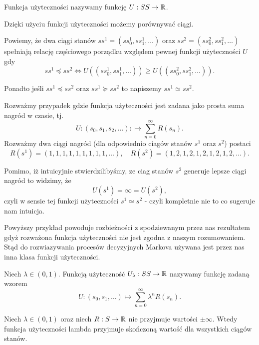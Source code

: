 \documentclass[10pt,a4paper]{book}
\begin{document}
\begin{definition}
Funkcja użyteczności nazywamy funkcję $U: SS \to \mathbb{R}$. 
\end{definition}

Dzięki użyciu funkcji użyteczności możemy porównywać ciągi.

\begin{definition}
Powiemy, że dwa ciągi stanów $ ss^1 = (ss^1_0, ss^1_1, \ldots)$ oraz $ss^2 = (ss^2_0, ss^2_1, \ldots)$ spełniają relację częściowego porządku względem pewnej funkcji użyteczności $U$ gdy
$$
ss^1 \preceq ss^2 \iff U((ss^1_0, ss^1_1, \ldots)) \geq U((ss^2_0, ss^2_1, \ldots)).
$$

Ponadto jeśli $ss^1 \preceq ss^2$ oraz $ss^1 \succeq ss^2$ to napiszemy $ ss^1 \simeq ss^2$.
\end{definition}

\begin{problem}
Rozważmy przypadek gdzie funkcja użyteczności jest zadana jako prosta suma nagród w czasie, tj.
$$
U : (s_0, s_1, s_2, \ldots) : \mapsto \sum_{n=0}^{\infty} R(s_n).
$$
Rozważmy dwa ciągi nagród (dla odpowiednio ciagów stanów $s^1$ oraz $s^2$) postaci
$$
R(s^1) = (1,1,1,1,1,1,1,1,1,\ldots), \quad R(s^2) = (1,2,1,2,1,2,1,2,1,2,\ldots).
$$

Pomimo, iż intuicyjnie stwierdzilibyśmy, ze ciag stanów $s^2$ generuje lepsze ciągi nagród to widzimy, że
$$
U(s^1) = \infty = U(s^2),
$$
czyli w sensie tej funkcji użyteczności $s^1 \simeq s^2$ - czyli kompletnie nie to co sugeruje nam intuicja.
\end{problem}

Powyższy przykład powoduje rozbieżności z spodziewanym przez nas rezultatem gdyż rozważona funkcja użyteczności nie jest zgodna z naszym rozumowaniem. Stąd do rozwiazywania procesów decyzyjnych Markova używana jest przez nas inna klasa funkcji użyteczności.

\begin{definition}
Niech $\lambda \in (0,1)$. Funkcją użyteczność $U_\lambda : SS \to \mathbb{R}$ nazywamy funkcję zadaną wzorem
$$
U: (s_0, s_1, \ldots) \mapsto \sum_{n=0}^{\infty} \lambda^n R(s_n).
$$
\end{definition} 

\begin{lemma}
Niech $\lambda \in (0,1)$ oraz niech $R : S \to \mathbb{R}$ nie przyjmuje wartości $\pm \infty$. Wtedy funkcja użyteczności lambda przyjmuje skończoną wartość dla wszystkich ciągów stanów.
\end{lemma}
\end{document}
